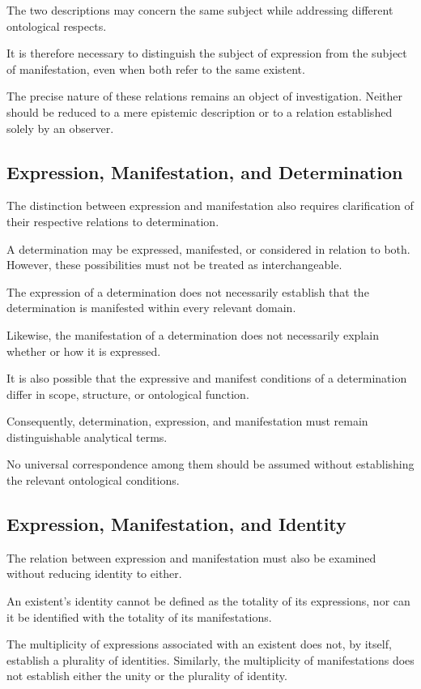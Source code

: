 The two descriptions may concern the same subject while
addressing different ontological respects.

It is therefore necessary to distinguish the subject
of expression from the subject of manifestation, even
when both refer to the same existent.

The precise nature of these relations remains an object
of investigation. Neither should be reduced to a mere
epistemic description or to a relation established solely
by an observer.

\subsection{Expression, Manifestation, and Determination}

The distinction between expression and manifestation
also requires clarification of their respective relations
to determination.

A determination may be expressed, manifested, or considered
in relation to both. However, these possibilities must
not be treated as interchangeable.

The expression of a determination does not necessarily
establish that the determination is manifested within
every relevant domain.

Likewise, the manifestation of a determination does not
necessarily explain whether or how it is expressed.

It is also possible that the expressive and manifest
conditions of a determination differ in scope, structure,
or ontological function.

Consequently, determination, expression, and manifestation
must remain distinguishable analytical terms.

No universal correspondence among them should be assumed
without establishing the relevant ontological conditions.

\subsection{Expression, Manifestation, and Identity}

The relation between expression and manifestation must
also be examined without reducing identity to either.

An existent's identity cannot be defined as the totality
of its expressions, nor can it be identified with the
totality of its manifestations.

The multiplicity of expressions associated with an existent
does not, by itself, establish a plurality of identities.
Similarly, the multiplicity of manifestations does not
establish either the unity or the plurality of identity.

